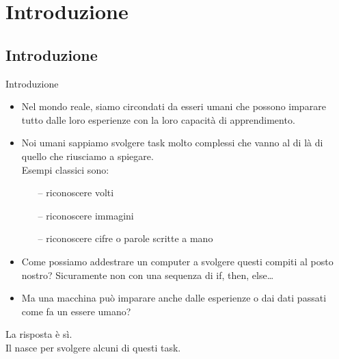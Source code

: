 \section[Introduzione]{Introduzione}

\subsection[Introduzione]{Introduzione}

\begin{frame}
	
	\begin{block}{Introduzione}
		\begin{itemize}
				\item Nel mondo reale, siamo circondati da esseri umani che possono imparare tutto dalle loro esperienze con la loro capacità di apprendimento.
				\item Noi umani sappiamo svolgere task molto complessi che vanno al di là di quello che riusciamo a spiegare.\\
					Esempi classici sono:
					\begin{itemize}
						\item[--] riconoscere volti
						\item[--] riconoscere immagini
						\item[--] riconoscere cifre o parole scritte a mano
					\end{itemize}
				\item Come possiamo addestrare un computer a svolgere questi compiti al posto nostro? Sicuramente non con una sequenza di if, then, else\ldots
				\item Ma una macchina può imparare anche dalle esperienze o dai dati passati come fa un essere umano?\\ 
			\end{itemize}
		La risposta è sì.\\
		Il \mlbold nasce per svolgere alcuni di questi task.
	\end{block}
\end{frame}


